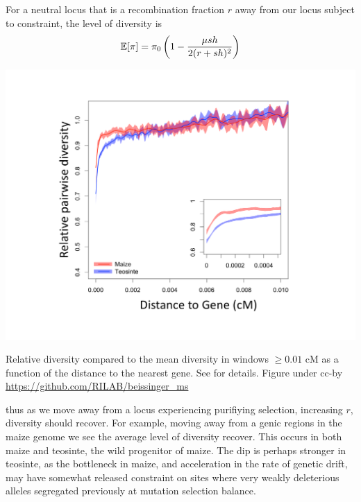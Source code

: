 For a neutral locus that is a recombination fraction $r$ away from our
locus subject to constraint, the level of diversity is
\begin{equation}
\mathbb{E}[\pi] = \pi_0  \left(1-\frac{\mu sh}{2(r+sh)^2} \right) \label{eqn:pi_loc_BGS}
\end{equation}
\begin{marginfigure}
\begin{center}
\includegraphics[width=\textwidth]{Journal_figs/recom_selection/maize_dist_gene/Figure4_beissinger_A.pdf}
\end{center}
\caption{Relative diversity compared to the mean diversity in windows
  $\ge 0.01$ cM as a function of the distance to the nearest gene.
  See \citep{beissinger2016recent} for details. Figure under cc-by \url{https://github.com/RILAB/beissinger_ms} } \label{fig:BGS_maize}
\end{marginfigure}
thus as we move away from a locus experiencing purifiying selection,
increasing $r$, diversity should recover. For example, moving away
from a genic regions in the maize genome we see the average level of
diversity recover. This occurs in both maize and teosinte, the wild
progenitor of maize. The dip is perhaps stronger in teosinte, as the
bottleneck in maize, and acceleration in the rate of genetic drift,
may have somewhat released constraint on sites where very weakly deleterious
alleles segregated previously at mutation selection balance. 

